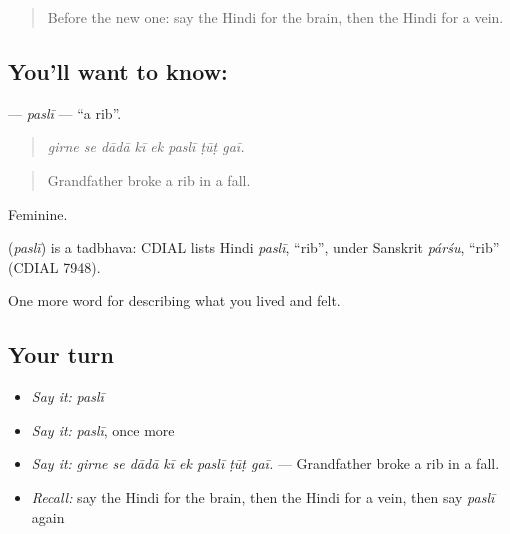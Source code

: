 \label{lesson:HI-C478-pasli}



\begin{quote}
Before the new one: say the Hindi for the brain, then the Hindi for a vein.
\end{quote}

\subsection*{You'll want to know: }
\textbf{} — \emph{paslī} — \textquotedblleft{}a rib\textquotedblright{}.

\begin{quote}
       
\end{quote}

\begin{quote}
\emph{girne se dādā kī ek paslī ṭūṭ gaī.}
\end{quote}

\begin{quote}
Grandfather broke a rib in a fall.
\end{quote}

Feminine.

\begin{cousinweb}
\textbf{} (\emph{paslī}) is a tadbhava: CDIAL lists Hindi \emph{paslī}, \textquotedblleft{}rib\textquotedblright{}, under Sanskrit \emph{párśu}, \textquotedblleft{}rib\textquotedblright{} (CDIAL 7948).
\end{cousinweb}

\begin{grammarlens}[title={What you've built}]
One more word for describing what you lived and felt.
\end{grammarlens}

\subsection*{Your turn}
\begin{itemize}
\raggedright
  \item \emph{Say it:} \emph{paslī}
  \item \emph{Say it:} \emph{paslī}, once more
  \item \emph{Say it:} \emph{girne se dādā kī ek paslī ṭūṭ gaī.} — Grandfather broke a rib in a fall.
  \item \emph{Recall:} say the Hindi for the brain, then the Hindi for a vein, then say \emph{paslī} again
\end{itemize}

